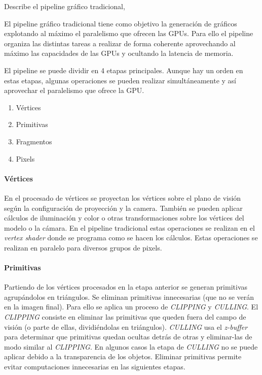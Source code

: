 \begin{pregunta}{Describe el pipeline gráfico tradicional}\sep{}

El pipeline gráfico tradicional tiene como objetivo la generación de gráficos
explotando al máximo el paralelismo que ofrecen las GPUs. Para ello el pipeline
organiza las distintas tareas a realizar de forma coherente aprovechando al
máximo las capacidades de las GPUs y ocultando la latencia de memoria.

El pipeline se puede dividir en 4 etapas principales. Aunque hay un orden en
estas etapas, algunas operaciones se pueden realizar simultáneamente y así
aprovechar el paralelismo que ofrece la GPU.

\begin{enumerate}
    \item Vértices
    \item Primitivas
    \item Fragmentos
    \item Pixels
\end{enumerate}

\paragraph{Vértices} En el procesado de vértices se proyectan los vértices sobre
el plano de visión según la configuración de proyección y la camera. También se
pueden aplicar cálculos de iluminación y color o otras transformaciones
sobre los vértices del modelo o la cámara. En el pipeline tradicional estas
operaciones se realizan en el \emph{vertex shader} donde se programa como se
hacen los cálculos. Estas operaciones se realizan en paralelo para diversos
grupos de pixels.

\paragraph{Primitivas} Partiendo de los vértices procesados en la etapa anterior
se generan primitivas agrupándolos en triángulos. Se eliminan primitivas
innecesarias (que no se verán en la imagen final). Para ello se aplica un
proceso de \emph{CLIPPING} y \emph{CULLING}. El \emph{CLIPPING} consiste en
eliminar las primitivas que queden fuera del campo de visión (o parte de ellas,
dividiéndolas en triángulos). \emph{CULLING} usa el \emph{z-buffer} para
determinar que primitivas quedan ocultas detrás de otras y eliminar-las de modo
similar al \emph{CLIPPING}. En algunos casos la etapa de \emph{CULLING} no se
puede aplicar debido a la transparencia de los objetos. Eliminar primitivas
permite evitar computaciones innecesarias en las siguientes etapas.


\end{pregunta}
